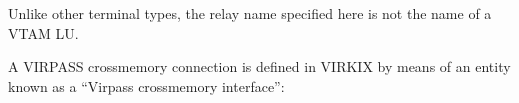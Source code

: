 \documentclass[letterpaper,10pt,english]{sphinxmanual}
\begin{document}
\sphinxAtStartPar
Unlike other terminal types, the relay name specified here is not the name of a VTAM LU.

\sphinxAtStartPar
{}

\sphinxAtStartPar
A VIRPASS cross\sphinxhyphen{}memory connection is defined in VIRKIX by means of an entity known as a “Virpass cross\sphinxhyphen{}memory interface”:

\begin{sphinxVerbatim}[commandchars=\\\{\}]
                
                                                                
   

\end{sphinxVerbatim}
\end{document}
